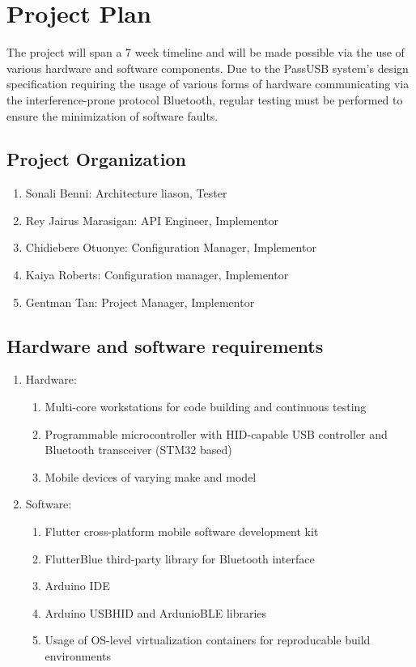 \documentclass[stu]{apa7}
\begin{document}
\section{Project Plan}

The project will span a 7 week timeline and will be made possible via the use of various hardware and software components. Due to the PassUSB system's design specification requiring the usage of various forms of hardware communicating via the interference-prone protocol Bluetooth, regular testing must be performed to ensure the minimization of software faults.

\subsection{Project Organization}
\begin{enumerate}
        \item Sonali Benni: Architecture liason, Tester
        \item Rey Jairus Marasigan: API Engineer, Implementor
        \item Chidiebere Otuonye: Configuration Manager, Implementor
        \item Kaiya Roberts: Configuration manager, Implementor
        \item Gentman Tan: Project Manager, Implementor
\end{enumerate}

\subsection{Hardware and software requirements}
\begin{enumerate}
  \item Hardware:
        \begin{enumerate}
                \item Multi-core workstations for code building and continuous testing
                \item Programmable microcontroller with HID-capable USB controller and Bluetooth transceiver (STM32 based)
                \item Mobile devices of varying make and model
        \end{enumerate}
  \item Software:
        \begin{enumerate}
                \item Flutter cross-platform mobile software development kit
                \item FlutterBlue third-party library for Bluetooth interface
                \item Arduino IDE
                \item Arduino USBHID and ArdunioBLE libraries
                \item Usage of OS-level virtualization containers for reproducable build environments
        \end{enumerate}
\end{enumerate}
\end{document}
